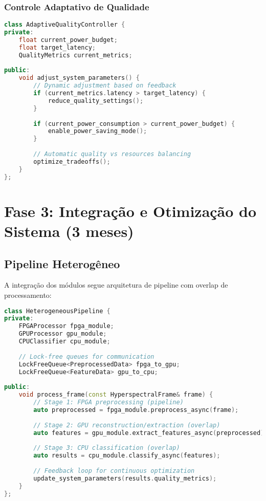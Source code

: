\subsubsection{Controle Adaptativo de Qualidade}

\begin{lstlisting}[language=c++, caption=Controle Adaptativo]
class AdaptiveQualityController {
private:
    float current_power_budget;
    float target_latency;
    QualityMetrics current_metrics;
    
public:
    void adjust_system_parameters() {
        // Dynamic adjustment based on feedback
        if (current_metrics.latency > target_latency) {
            reduce_quality_settings();
        }
        
        if (current_power_consumption > current_power_budget) {
            enable_power_saving_mode();
        }
        
        // Automatic quality vs resources balancing
        optimize_tradeoffs();
    }
};
\end{lstlisting}

\section{Fase 3: Integração e Otimização do Sistema (3 meses)}

\subsection{Pipeline Heterogêneo}

A integração dos módulos segue arquitetura de pipeline com overlap de processamento:

\begin{lstlisting}[language=c++, caption=Pipeline Heterogêneo]
class HeterogeneousPipeline {
private:
    FPGAProcessor fpga_module;
    GPUProcessor gpu_module;
    CPUClassifier cpu_module;
    
    // Lock-free queues for communication
    LockFreeQueue<PreprocessedData> fpga_to_gpu;
    LockFreeQueue<FeatureData> gpu_to_cpu;
    
public:
    void process_frame(const HyperspectralFrame& frame) {
        // Stage 1: FPGA preprocessing (pipeline)
        auto preprocessed = fpga_module.preprocess_async(frame);
        
        // Stage 2: GPU reconstruction/extraction (overlap)
        auto features = gpu_module.extract_features_async(preprocessed);
        
        // Stage 3: CPU classification (overlap)
        auto results = cpu_module.classify_async(features);
        
        // Feedback loop for continuous optimization
        update_system_parameters(results.quality_metrics);
    }
};
\end{lstlisting}

